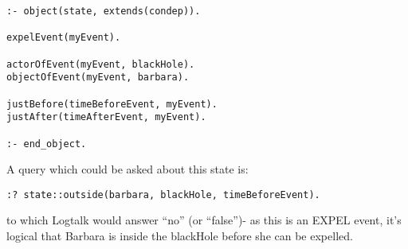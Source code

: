 \documentclass[report]{subfiles}
\begin{document}
\begin{lstlisting}[caption={An example `state', inhereitting from the `condep' Logtalk object},]
:- object(state, extends(condep)).

expelEvent(myEvent).

actorOfEvent(myEvent, blackHole).
objectOfEvent(myEvent, barbara).

justBefore(timeBeforeEvent, myEvent).
justAfter(timeAfterEvent, myEvent).		

:- end_object.
\end{lstlisting}

A query which could be asked about this state is:
\begin{lstlisting}
:? state::outside(barbara, blackHole, timeBeforeEvent).
\end{lstlisting}
to which Logtalk would answer ``no'' (or ``false'')- as this is an EXPEL event, it's logical that Barbara is inside the blackHole before she can be expelled.
\end{document}

